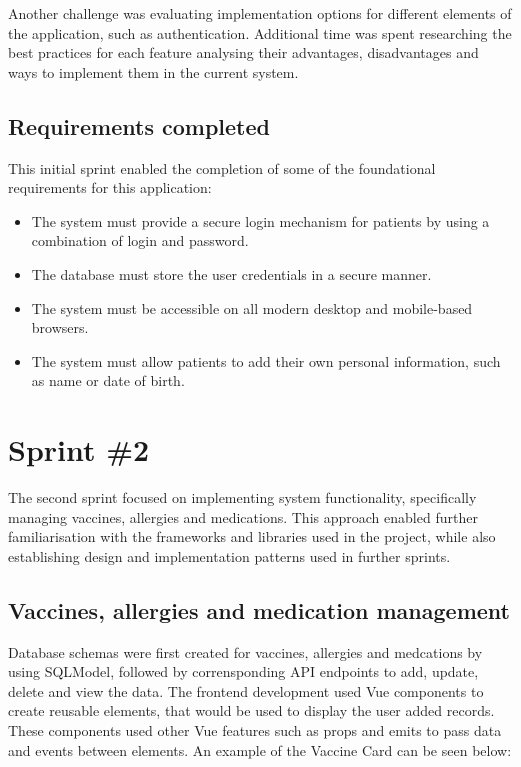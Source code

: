 Another challenge was evaluating implementation options for different elements of the application, such as authentication. Additional time was spent researching the best practices for each feature \- analysing their advantages, disadvantages and ways to implement them in the current system.

\subsection{Requirements completed}

This initial sprint enabled the completion of some of the foundational requirements for this application:

\begin{itemize}
    \item The system must provide a secure login mechanism for patients by using a combination of login and password.
    \item The database must store the user credentials in a secure manner.
    \item The system must be accessible on all modern desktop and mobile-based browsers.
    \item The system must allow patients to add their own personal information, such as name or date of birth.
\end{itemize}

\section{Sprint \#2}

The second sprint focused on implementing system functionality, specifically managing vaccines, allergies and medications. This approach enabled further familiarisation with the frameworks and libraries used in the project, while also establishing design and implementation patterns used in further sprints.

\subsection{Vaccines, allergies and medication management}

Database schemas were first created for vaccines, allergies and medcations by using SQLModel, followed by corrensponding API endpoints to add, update, delete and view the data. The frontend development used Vue components to create reusable elements, that would be used to display the user added records. These components used other Vue features such as props and emits to pass data and events between elements. An example of the Vaccine Card can be seen below:

